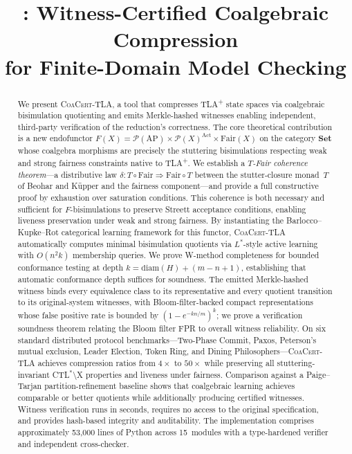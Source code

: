 \documentclass[11pt]{article}
\title{\CoaCert{}: Witness-Certified Coalgebraic Compression\\for Finite-Domain \TLAplus{} Model Checking}
\date{}
\newcommand{\Set}{\mathbf{Set}}
\newcommand{\Pow}{\mathcal{P}}
\newcommand{\Fair}{\ensuremath{\mathrm{Fair}}}
\newcommand{\Act}{\ensuremath{\mathrm{Act}}}
\newcommand{\AP}{\ensuremath{\mathrm{AP}}}
\newcommand{\TFair}{$T$-Fair}
\newcommand{\CoaCert}{\textsc{CoaCert-TLA}}
\newcommand{\TLAplus}{TLA\textsuperscript{+}}
\newcommand{\diam}{\ensuremath{\mathrm{diam}}}
\begin{document}
\maketitle

\begin{abstract}
We present \CoaCert{}, a tool that compresses \TLAplus{} state spaces via
coalgebraic bisimulation quotienting and emits Merkle-hashed witnesses
enabling independent, third-party verification of the reduction's correctness.
The core theoretical contribution is a new endofunctor
$F(X) = \Pow(\AP) \times \Pow(X)^{\Act} \times \Fair(X)$
on the category $\Set$ whose coalgebra morphisms are precisely the
stuttering bisimulations respecting weak and strong fairness constraints
native to \TLAplus{}.
We establish a \emph{\TFair{} coherence theorem}---a distributive law
$\delta : T \circ \Fair \Rightarrow \Fair \circ T$ between the
stutter-closure monad~$T$ of Beohar and K\"upper and the fairness component---and
provide a full constructive proof by exhaustion over saturation conditions.
This coherence is both necessary and sufficient for $F$-bisimulations to
preserve Streett acceptance conditions, enabling liveness preservation
under weak and strong fairness.
By instantiating the Barlocco--Kupke--Rot categorical learning framework
for this functor, \CoaCert{} automatically computes minimal bisimulation
quotients via $L^*$-style active learning with
$O(n^2 k)$ membership queries.
We prove W-method completeness for bounded conformance testing at
depth $k = \diam(H) + (m - n + 1)$, establishing that automatic
conformance depth suffices for soundness.
The emitted Merkle-hashed witness binds every equivalence class to its
representative and every quotient transition to its original-system witnesses,
with Bloom-filter-backed compact representations whose false positive rate
is bounded by $(1 - e^{-kn/m})^k$; we prove a verification soundness
theorem relating the Bloom filter FPR to overall witness reliability.
On six standard distributed protocol benchmarks---Two-Phase Commit, Paxos,
Peterson's mutual exclusion, Leader Election, Token Ring, and Dining
Philosophers---\CoaCert{} achieves compression ratios from
$4\times$ to $50\times$ while preserving all stuttering-invariant
CTL$^*$$\setminus$X properties and liveness under fairness.
Comparison against a Paige--Tarjan partition-refinement baseline shows
that coalgebraic learning achieves comparable or better quotients while
additionally producing certified witnesses.
Witness verification runs in seconds, requires no access to the original
specification, and provides hash-based integrity and auditability.
The implementation comprises approximately 53{,}000 lines of Python
across 15~modules with a type-hardened verifier and independent cross-checker.
\end{abstract}
\end{document}
